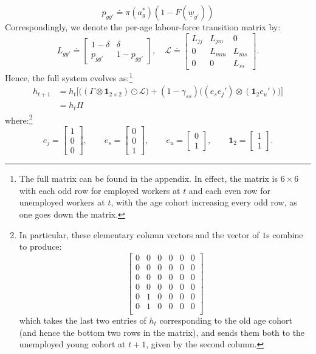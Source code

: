 \documentclass{article}
\newcommand{\lbar}[1]{\underline{#1}} %
\begin{document}
\[
p_{gg'}\doteq\pi(a^*_g)(1-F(\lbar{w}_{g'}))
\]
Correspondingly, we denote the per-age labour-force transition matrix by:
\[
L_{gg'}
\doteq
\begin{bmatrix}
1-\delta & \delta \\
p_{gg'} & 1-p_{gg'}
\end{bmatrix},\quad
\mathcal L
\doteq
\begin{bmatrix}
L_{jj} & L_{jm} & 0 \\
0 & L_{mm} & L_{ms} \\
0 & 0 & L_{ss}
\end{bmatrix}.
\]
Hence, the full system evolves as:\footnote{The full matrix can be found in the appendix. In effect, the matrix is $6\times6$ with each odd row for employed workers at $t$ and each even row for unemployed workers at $t$, with the age cohort increasing every odd row, as one goes down the matrix.}
\begin{align*}
h_{t+1}&=h_t\bigr[\bigl((\Gamma\otimes\mathbf{1}_{2\times 2})\odot\mathcal{L}\bigr)+(1-\gamma_{ss})\bigl((e_s e_j')\otimes(\mathbf 1_2 e_u')\bigr)\bigl]\\
&=h_t\Pi
\end{align*}
where:\footnote{In particular, these elementary column vectors and the vector of $1$s combine to produce:
\[
\begin{bmatrix}
0 & 0 & 0 & 0 & 0 & 0 \\
0 & 0 & 0 & 0 & 0 & 0 \\
0 & 0 & 0 & 0 & 0 & 0 \\
0 & 0 & 0 & 0 & 0 & 0 \\
0 & 1 & 0 & 0 & 0 & 0 \\
0 & 1 & 0 & 0 & 0 & 0 \\
\end{bmatrix}
\]
which takes the last two entries of $h_t$ corresponding to the old age cohort (and hence the bottom two rows in the matrix), and sends them both to the unemployed young cohort at $t+1$, given by the second column.}
\[
e_j=
\begin{bmatrix}1\\0\\0\end{bmatrix},
\qquad
e_s=
\begin{bmatrix}0\\0\\1\end{bmatrix},
\qquad
e_u=
\begin{bmatrix}0\\1\end{bmatrix},
\qquad
\mathbf 1_2=
\begin{bmatrix}1\\1\end{bmatrix}.
\]
\end{document}
